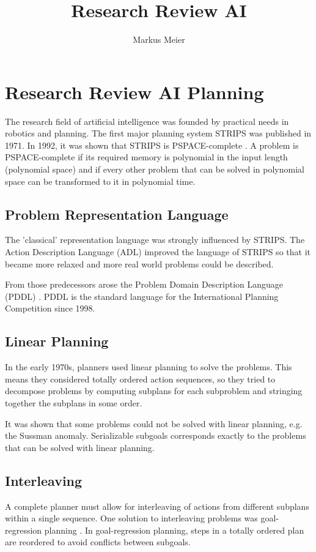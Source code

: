 \documentclass[12pt,a4paper,notitlepage]{article}
\author{Markus Meier}
\title{Research Review AI}
\begin{document}
\section{Research Review AI Planning}
The research field of artificial intelligence was founded by practical needs in robotics and planning. The first major planning system STRIPS \cite{fikes1971strips} was published in 1971. In 1992, it was shown that STRIPS is PSPACE-complete \cite{bylander1994computational}. A problem is PSPACE-complete if its required memory is polynomial in the input length (polynomial space) and if every other problem that can be solved in polynomial space can be transformed to it in polynomial time. 

\subsection{Problem Representation Language}
The 'classical' representation language was strongly influenced by STRIPS. The Action Description Language (ADL) \cite{pednault1986formulating} improved the language of STRIPS so that it became more relaxed and more real world problems could be described.

From those predecessors arose the Problem Domain Description Language (PDDL) \cite{mcdermott1998pddl}. PDDL is the standard language for the International Planning Competition since 1998.

\subsection{Linear Planning}
In the early 1970s, planners used linear planning \cite{sacerdoti1975structure} to solve the problems. This means they considered totally ordered action sequences, so they tried to decompose problems by computing subplans for each subproblem and stringing together the subplans in some order.

It was shown that some problems could not be solved with linear planning, e.g. the Sussman anomaly. Serializable subgoals \cite{korf1987planning} corresponds exactly to the problems that can be solved with linear planning.

\subsection{Interleaving}
A complete planner must allow for interleaving of actions from different subplans within a single sequence. One solution to interleaving problems was goal-regression planning \cite{waldinger1975achieving}. In goal-regression planning, steps in a totally ordered plan are reordered to avoid conflicts between subgoals.
\end{document}
